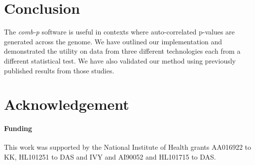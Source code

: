 \documentclass{bioinfo}
\begin{document}
\section{Conclusion}

The \textit{comb-p} software is useful in contexts where auto-correlated
p-values are generated across the genome.
We have outlined our implementation and demonstrated
the utility on data from three different technologies each from a
different statistical test. We have also validated our method using
previously published results from those studies.

\section*{Acknowledgement}
\paragraph{Funding\textcolon}
This work was supported by the National Institute of Health grants
AA016922 to KK, HL101251 to DAS and IVY and AI90052 and HL101715 to DAS.

%
%
%
%
%
%
%
%
%
\end{document}
